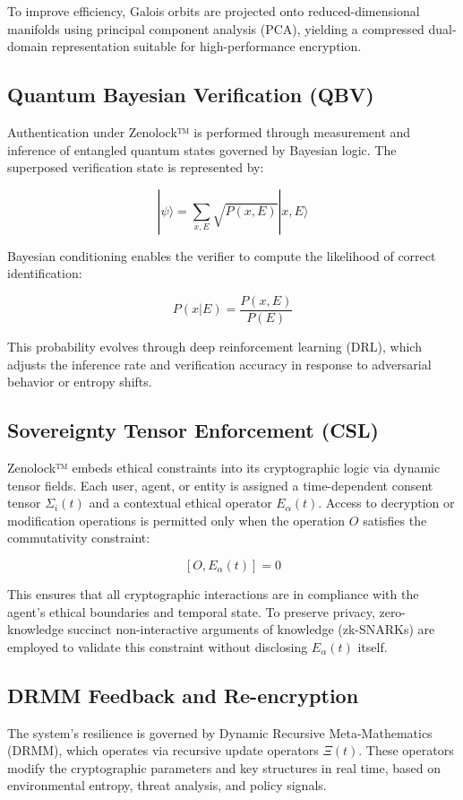 \documentclass{article}
\theoremstyle{plain}
\begin{document}
To improve efficiency, Galois orbits are projected onto reduced-dimensional manifolds using principal component analysis (PCA), yielding a compressed dual-domain representation suitable for high-performance encryption.

\subsection{Quantum Bayesian Verification (QBV)}

Authentication under Zenolock™ is performed through measurement and inference of entangled quantum states governed by Bayesian logic. The superposed verification state is represented by:

\[
|\psi\rangle = \sum_{x,E} \sqrt{P(x, E)} |x, E\rangle
\]

Bayesian conditioning enables the verifier to compute the likelihood of correct identification:

\[
P(x|E) = \frac{P(x, E)}{P(E)}
\]

This probability evolves through deep reinforcement learning (DRL), which adjusts the inference rate and verification accuracy in response to adversarial behavior or entropy shifts.

\subsection{Sovereignty Tensor Enforcement (CSL)}

Zenolock™ embeds ethical constraints into its cryptographic logic via dynamic tensor fields. Each user, agent, or entity is assigned a time-dependent consent tensor $\Sigma_i(t)$ and a contextual ethical operator $E_\alpha(t)$. Access to decryption or modification operations is permitted only when the operation $O$ satisfies the commutativity constraint:

\[
[O, E_\alpha(t)] = 0
\]

This ensures that all cryptographic interactions are in compliance with the agent’s ethical boundaries and temporal state. To preserve privacy, zero-knowledge succinct non-interactive arguments of knowledge (zk-SNARKs) are employed to validate this constraint without disclosing $E_\alpha(t)$ itself.

\subsection{DRMM Feedback and Re-encryption}

The system's resilience is governed by Dynamic Recursive Meta-Mathematics (DRMM), which operates via recursive update operators $\Xi(t)$. These operators modify the cryptographic parameters and key structures in real time, based on environmental entropy, threat analysis, and policy signals.
\end{document}
